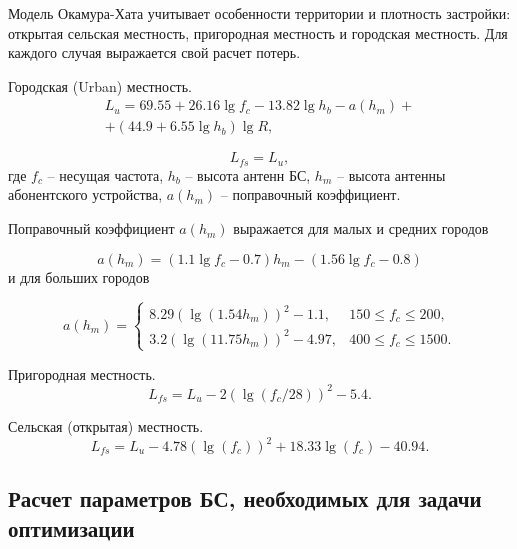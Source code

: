 Модель Окамура-Хата учитывает особенности территории и плотность застройки: открытая сельская местность, пригородная местность и городская местность. Для каждого случая выражается свой расчет потерь.

Городская  (Urban) местность.
\begin{equation}
  \label{eq:part1_okam_hata_model_l_u}
  \begin{gathered}
  L_u = 69.55 + 26.16\lg{f_c} - 13.82\lg{h_b} - a(h_m) + \\ + (44.9 + 6.55 \lg{h_b}) \lg{R},
  \end{gathered}
\end{equation}

\begin{equation}
  \label{eq:part1_okam_hata_model_l_ufs}
  L_{fs} = L_u,
\end{equation}
где $f_c$ -- несущая частота, $h_b$ --  высота антенн БС, $h_m$ -- высота антенны абонентского устройства, $a(h_m)$ -- поправочный коэффициент. 

Поправочный коэффициент $a(h_m)$ выражается для малых и средних городов

\begin{equation}
  \label{eq:part1_okam_hata_model_a(h_m)_1}
  a(h_m) = (1.1 \lg{f_c} - 0.7) h_m - (1.56 \lg{f_c} - 0.8)
\end{equation}
и для больших городов

\begin{equation}
  \label{eq:part1_okam_hata_model_a(h_m)_2}
  a(h_m) = 
  \begin{cases}
    8.29(\lg{(1.54h_m)})^2 - 1.1, & 150 \leq f_c \leq 200,\\
    3.2(\lg{(11.75h_m)})^2 - 4.97,  & 400 \leq f_c \leq 1500.
  \end{cases}
\end{equation}

Пригородная местность.
\begin{equation}
  \label{eq:part1_okam_hata_model_l_sfs}
  L_{fs} = L_u - 2(\lg(f_c/28))^2 -5.4.
\end{equation}

Сельская (открытая) местность.
\begin{equation}
  \label{eq:part1_okam_hata_model_l_ofs}
  L_{fs} = L_u - 4.78(\lg(f_c))^2 + 18.33\lg(f_c) - 40.94.
\end{equation}

\subsection{Расчет параметров БС, необходимых для задачи оптимизации}

